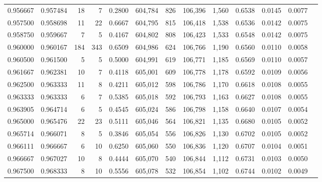 \begin{tabular}{rrrrrrrrrrrrr}
0.956667 & 0.957484 &    18 &   7 &                                     0.2800 & 604,784 &     826 & 106,396 &   1,560 & 0.6538 & 0.0145 & 0.0077 \\
0.957500 & 0.958698 &    11 &  22 &                                     0.6667 & 604,795 &     815 & 106,418 &   1,538 & 0.6536 & 0.0142 & 0.0075 \\
0.958750 & 0.959667 &     7 &   5 &                                     0.4167 & 604,802 &     808 & 106,423 &   1,533 & 0.6548 & 0.0142 & 0.0075 \\
0.960000 & 0.960167 &   184 & 343 &                                     0.6509 & 604,986 &     624 & 106,766 &   1,190 & 0.6560 & 0.0110 & 0.0058 \\
0.960500 & 0.961500 &     5 &   5 &                                     0.5000 & 604,991 &     619 & 106,771 &   1,185 & 0.6569 & 0.0110 & 0.0057 \\
0.961667 & 0.962381 &    10 &   7 &                                     0.4118 & 605,001 &     609 & 106,778 &   1,178 & 0.6592 & 0.0109 & 0.0056 \\
0.962500 & 0.963333 &    11 &   8 &                                     0.4211 & 605,012 &     598 & 106,786 &   1,170 & 0.6618 & 0.0108 & 0.0055 \\
0.963333 & 0.963333 &     6 &   7 &                                     0.5385 & 605,018 &     592 & 106,793 &   1,163 & 0.6627 & 0.0108 & 0.0055 \\
0.963905 & 0.964714 &     6 &   5 &                                     0.4545 & 605,024 &     586 & 106,798 &   1,158 & 0.6640 & 0.0107 & 0.0054 \\
0.965000 & 0.965476 &    22 &  23 &                                     0.5111 & 605,046 &     564 & 106,821 &   1,135 & 0.6680 & 0.0105 & 0.0052 \\
0.965714 & 0.966071 &     8 &   5 &                                     0.3846 & 605,054 &     556 & 106,826 &   1,130 & 0.6702 & 0.0105 & 0.0052 \\
0.966111 & 0.966667 &     6 &  10 &                                     0.6250 & 605,060 &     550 & 106,836 &   1,120 & 0.6707 & 0.0104 & 0.0051 \\
0.966667 & 0.967027 &    10 &   8 &                                     0.4444 & 605,070 &     540 & 106,844 &   1,112 & 0.6731 & 0.0103 & 0.0050 \\
0.967500 & 0.968333 &     8 &  10 &                                     0.5556 & 605,078 &     532 & 106,854 &   1,102 & 0.6744 & 0.0102 & 0.0049 \\

\end{tabular}
